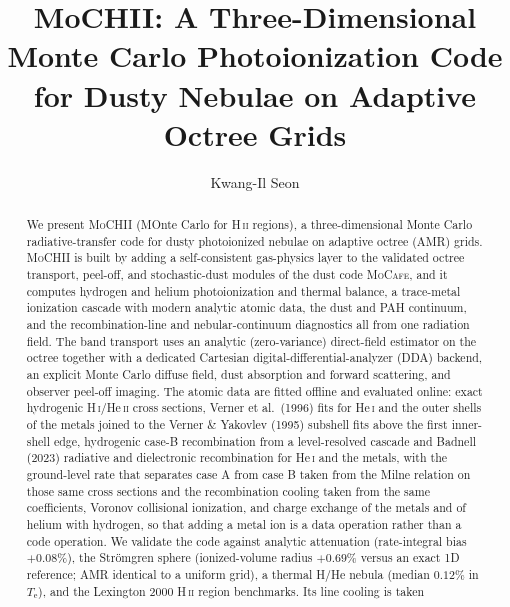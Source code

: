 \documentclass[twocolumn,linenumbers]{aastex702}
\newcommand{\MoCHII}{\textsc{MoCHII}}
\newcommand{\MoCafe}{\textsc{MoCafe}}
\newcommand{\HII}{H\,\textsc{ii}}
\newcommand{\HI}{H\,\textsc{i}}
\newcommand{\HeI}{He\,\textsc{i}}
\newcommand{\HeII}{He\,\textsc{ii}}
\newcommand{\Te}{T_{\mathrm{e}}}
\begin{document}
\title{MoCHII: A Three-Dimensional Monte Carlo Photoionization
Code for Dusty Nebulae on Adaptive Octree Grids}

\author[orcid=0000-0001-9561-8134,gname=Kwang-Il,sname=Seon]{Kwang-Il Seon}

\begin{abstract}
We present \MoCHII{} (MOnte Carlo for \HII{} regions), a
three-dimensional Monte Carlo radiative-transfer code for dusty
photoionized nebulae on adaptive octree (AMR) grids.  \MoCHII{} is built
by adding a self-consistent gas-physics layer to the validated octree
transport, peel-off, and stochastic-dust modules of the dust code
\MoCafe{}, and it computes hydrogen and helium photoionization and
thermal balance, a trace-metal ionization cascade with modern analytic
atomic data, the dust and PAH continuum, and the recombination-line and
nebular-continuum diagnostics all from one radiation field.  The band
transport uses an analytic (zero-variance) direct-field estimator on the
octree together with a dedicated Cartesian digital-differential-analyzer
(DDA) backend, an explicit Monte Carlo diffuse field, dust absorption and
forward scattering, and observer peel-off imaging.  The atomic data are
fitted offline and evaluated online: exact hydrogenic \HI/\HeII{} cross
sections, Verner et al.\ (1996) fits for \HeI{} and the outer shells of
the metals joined to the Verner \& Yakovlev (1995) subshell fits above the
first inner-shell edge, hydrogenic case-B recombination from a
level-resolved cascade and Badnell
(2023) radiative and dielectronic recombination for \HeI{} and the metals,
with the ground-level rate that separates case A from case B taken from
the Milne relation on those same cross
sections and the recombination cooling taken from the same coefficients,
Voronov collisional ionization,
and charge exchange of the metals and of helium with hydrogen, so that
adding a metal ion is a data operation
rather than a code operation.  We validate the code against analytic
attenuation (rate-integral bias $+0.08\%$), the Str\"omgren sphere
(ionized-volume radius $+0.69\%$ versus an exact 1D reference; AMR identical to
a uniform grid), a thermal H/He nebula (median $0.12\%$ in $\Te$), and
the Lexington 2000 \HII{} region benchmarks.  Its line cooling is taken

\end{abstract}
\end{document}
